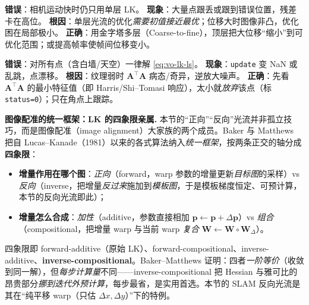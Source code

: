 \begin{pitfall}
\textbf{错误}：相机运动快时仍只用单层 LK。
\textbf{现象}：大量点跟丢或跟到错误位置，残差卡在高位。
\textbf{根因}：单层光流的优化\emph{需要初值接近最优}；位移大时图像非凸，优化困在局部极小。
\textbf{正确}：用金字塔多层（Coarse-to-fine），顶层把大位移“缩小”到可优化范围；或提高帧率使帧间位移变小。
\end{pitfall}

\begin{pitfall}
\textbf{错误}：对所有点（含白墙/天空）一律解 \cref{eq:vo-lk-ls}。
\textbf{现象}：\texttt{update} 变 NaN 或乱跳，点漂移。
\textbf{根因}：纹理弱时 $\mathbf{A}^\top\mathbf{A}$ 病态/奇异，逆放大噪声。
\textbf{正确}：先看 $\mathbf{A}^\top\mathbf{A}$ 的最小特征值（即 Harris/Shi--Tomasi 响应），太小就\emph{放弃}该点（标 \texttt{status=0}）；只在角点上跟踪。
\end{pitfall}

\begin{note}
\textbf{图像配准的统一框架：LK 的四象限亲属.}\;
本节的“正向”“反向”光流并非孤立技巧，而是图像配准（image alignment）大家族的两个成员。Baker 与 Matthews\cite{baker2004lk} 把自 Lucas--Kanade（1981）以来的各式算法纳入\emph{统一框架}，按两条正交的轴分成\textbf{四象限}：
\begin{itemize}
  \item \textbf{增量作用在哪个图}：\emph{正向}（forward，warp 参数的增量更新\emph{目标图}的采样）vs \emph{反向}（inverse，把增量\emph{反过来}施加到\emph{模板图}，于是模板梯度恒定、可预计算，本节的反向光流即此）；
  \item \textbf{增量怎么合成}：\emph{加性}（additive，参数直接相加 $\mathbf{p}\!\leftarrow\!\mathbf{p}+\Delta\mathbf{p}$）vs \emph{组合}（compositional，把增量 warp 与当前 warp \emph{复合} $\mathbf{W}\!\leftarrow\!\mathbf{W}\circ\mathbf{W}_{\Delta}$）。
\end{itemize}
四象限即 forward-additive（原始 LK）、forward-compositional、inverse-additive、\textbf{inverse-compositional}。Baker--Matthews 证明：四者\emph{一阶等价}（收敛到同一解），但\emph{每步计算量}不同——inverse-compositional 把 Hessian 与雅可比的昂贵部分\emph{挪到迭代外预计算}，每步最省，是实用首选。本节的 SLAM 反向光流是其在“纯平移 warp（只估 $\Delta x,\Delta y$）”下的特例。
\end{note}

